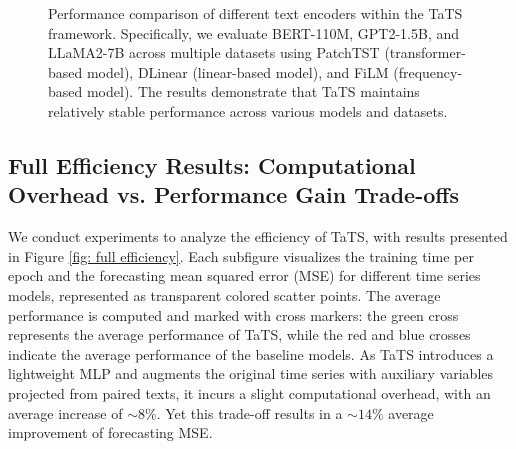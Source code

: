 
\begin{figure*}[h]
\centering
\vspace{-3mm}
\caption{Performance comparison of different text encoders within the TaTS framework. Specifically, we evaluate BERT-110M, GPT2-1.5B, and LLaMA2-7B across multiple datasets using PatchTST (transformer-based model), DLinear (linear-based model), and FiLM (frequency-based model). The results demonstrate that TaTS maintains relatively stable performance across various models and datasets.}
\label{fig: full ablation text encoder}
\vspace{-3mm}
\end{figure*}



\clearpage
\subsection{Full Efficiency Results: Computational Overhead vs. Performance Gain Trade-offs}
\label{ap: full efficiency}
We conduct experiments to analyze the efficiency of TaTS, with results presented in Figure \ref{fig: full efficiency}. Each subfigure visualizes the training time per epoch and the forecasting mean squared error (MSE) for different time series models, represented as transparent colored scatter points. The average performance is computed and marked with cross markers: the green cross represents the average performance of TaTS, while the red and blue crosses indicate the average performance of the baseline models. As TaTS introduces a lightweight MLP and augments the original time series with auxiliary variables projected from paired texts, it incurs a slight computational overhead, with an average increase of $\sim 8\%$. Yet this trade-off results in a $\sim 14\%$ average improvement of forecasting MSE.

